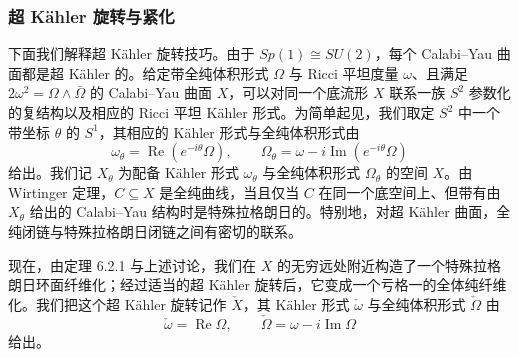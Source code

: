\subsubsection{超 Kähler 旋转与紧化}
下面我们解释超 Kähler 旋转技巧。由于 $Sp(1)\cong SU(2)$，每个 Calabi--Yau 曲面都是超 Kähler 的。给定带全纯体积形式 $\Omega$ 与 Ricci 平坦度量 $\omega$、且满足 $2\omega^2=\Omega\wedge\bar\Omega$ 的 Calabi--Yau 曲面 $X$，可以对同一个底流形 $X$ 联系一族 $S^2$ 参数化的复结构以及相应的 Ricci 平坦 Kähler 形式。为简单起见，我们取定 $S^2$ 中一个带坐标 $\theta$ 的 $S^1$，其相应的 Kähler 形式与全纯体积形式由
\[
\omega_\theta=\operatorname{Re}(e^{-i\theta}\Omega),\qquad \Omega_\theta=\omega-i\operatorname{Im}(e^{-i\theta}\Omega)
\]
给出。我们记 $X_\theta$ 为配备 Kähler 形式 $\omega_\theta$ 与全纯体积形式 $\Omega_\theta$ 的空间 $X$。由 Wirtinger 定理，$C\subseteq X$ 是全纯曲线，当且仅当 $C$ 在同一个底空间上、但带有由 $X_\theta$ 给出的 Calabi--Yau 结构时是特殊拉格朗日的。特别地，对超 Kähler 曲面，全纯闭链与特殊拉格朗日闭链之间有密切的联系。

现在，由定理 6.2.1 与上述讨论，我们在 $X$ 的无穷远处附近构造了一个特殊拉格朗日环面纤维化；经过适当的超 Kähler 旋转后，它变成一个亏格一的全体纯纤维化。我们把这个超 Kähler 旋转记作 $\check X$，其 Kähler 形式 $\check\omega$ 与全纯体积形式 $\check\Omega$ 由
\begin{equation}
\check\omega=\operatorname{Re}\Omega,\qquad \check\Omega=\omega-i\operatorname{Im}\Omega
\tag{6.2.2}
\end{equation}
给出。

